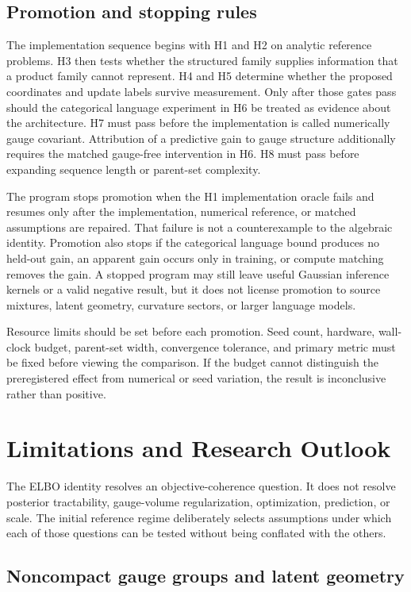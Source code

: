 \section{Promotion and stopping rules}

The implementation sequence begins with H1 and H2 on analytic reference problems. H3 then tests whether the structured family supplies information that a product family cannot represent. H4 and H5 determine whether the proposed coordinates and update labels survive measurement. Only after those gates pass should the categorical language experiment in H6 be treated as evidence about the architecture. H7 must pass before the implementation is called numerically gauge covariant. Attribution of a predictive gain to gauge structure additionally requires the matched gauge-free intervention in H6. H8 must pass before expanding sequence length or parent-set complexity.

The program stops promotion when the H1 implementation oracle fails and resumes only after the implementation, numerical reference, or matched assumptions are repaired. That failure is not a counterexample to the algebraic identity. Promotion also stops if the categorical language bound produces no held-out gain, an apparent gain occurs only in training, or compute matching removes the gain. A stopped program may still leave useful Gaussian inference kernels or a valid negative result, but it does not license promotion to source mixtures, latent geometry, curvature sectors, or larger language models.

Resource limits should be set before each promotion. Seed count, hardware, wall-clock budget, parent-set width, convergence tolerance, and primary metric must be fixed before viewing the comparison. If the budget cannot distinguish the preregistered effect from numerical or seed variation, the result is inconclusive rather than positive.

\chapter{Limitations and Research Outlook}

The ELBO identity resolves an objective-coherence question. It does not resolve posterior tractability, gauge-volume regularization, optimization, prediction, or scale. The initial reference regime deliberately selects assumptions under which each of those questions can be tested without being conflated with the others.

\section{Noncompact gauge groups and latent geometry}


